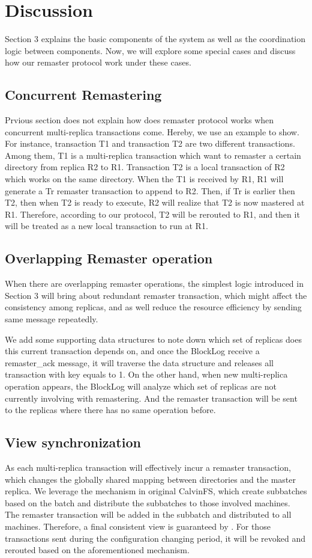 \section{Discussion}
Section 3 explains the basic components of the system as well as the coordination logic between components. Now, we will explore some special cases and discuss how our remaster protocol work under these cases.


\subsection{Concurrent Remastering}
Prvious section does not explain how does remaster protocol works when concurrent multi-replica transactions come. Hereby, we use an example to show. For instance, transaction T1 and transaction T2 are two different transactions. Among them, T1 is a multi-replica transaction which want to remaster a certain directory from replica R2 to R1. Transaction T2 is a local transaction of R2 which works on the same directory. When the T1 is received by R1, R1 will generate a Tr remaster transaction to append to R2. Then, if Tr is earlier then T2, then when T2 is ready to execute, R2 will realize that T2 is now mastered at R1. Therefore, according to our protocol, T2 will be rerouted to R1, and then it will be treated as a new local transaction to run at R1.

\subsection{Overlapping Remaster operation}
When there are overlapping remaster operations, the simplest logic introduced in Section 3 will bring about redundant remaster transaction, which might affect the consistency among replicas, and as well reduce the resource efficiency by sending same message repeatedly.

We add some supporting data structures to note down which set of replicas does this current transaction depends on, and once the BlockLog receive a remaster\_ack message, it will traverse the data structure and releases all transaction with key equals to 1. On the other hand, when new multi-replica operation appears, the BlockLog will analyze which set of replicas are not currently involving with remastering. And the remaster transaction will be sent to the replicas where there has no same operation before. 

\subsection{View synchronization}
As each multi-replica transaction will effectively incur a remaster transaction, which changes the globally shared mapping between directories and the master replica. We leverage the mechanism in original CalvinFS, which create subbatches based on the batch and distribute the subbatches to those involved machines. The remaster transaction will be added in the subbatch and distributed to all machines. Therefore, a final consistent view is guaranteed by \name{}. For those transactions sent during the configuration changing period, it will be revoked and rerouted based on the aforementioned mechanism.


